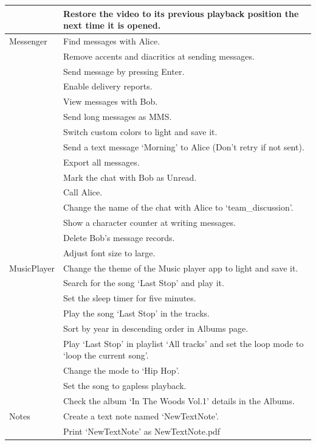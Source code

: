 \begin{longtable}{|p{1.8cm}|p{10.5cm}|}
        & Restore the video to its previous playback position the next time it is opened. \\
\hline
Messenger & Find messages with Alice. \\
          & Remove accents and diacritics at sending messages. \\
          & Send message by pressing Enter. \\
          & Enable delivery reports. \\
          & View messages with Bob. \\
          & Send long messages as MMS. \\
          & Switch custom colors to light and save it. \\
          & Send a text message `Morning' to Alice (Don't retry if not sent). \\
          & Export all messages. \\
          & Mark the chat with Bob as Unread. \\
          & Call Alice. \\
          & Change the name of the chat with Alice to `team\_discussion'. \\
          & Show a character counter at writing messages. \\
          & Delete Bob's message records. \\
          & Adjust font size to large. \\
\hline
MusicPlayer & Change the theme of the Music player app to light and save it. \\
            & Search for the song `Last Stop' and play it. \\
            & Set the sleep timer for five minutes. \\
            & Play the song `Last Stop' in the tracks. \\
            & Sort by year in descending order in Albums page. \\
            & Play `Last Stop' in playlist `All tracks' and set the loop mode to `loop the current song'. \\
            & Change the mode to `Hip Hop'. \\
            & Set the song to gapless playback.\\
            & Check the album `In The Woods Vol.1' details in the Albums. \\
\hline
Notes & Create a text note named `NewTextNote'. \\
      & Print `NewTextNote' as NewTextNote.pdf \\

\end{longtable}
